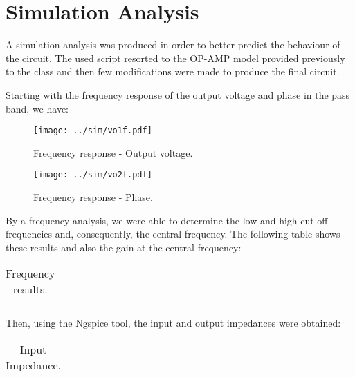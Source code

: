 \section{Simulation Analysis}
\label{sec:simulation}

\par A simulation analysis was produced in order to better predict the behaviour of the circuit. The used script resorted to the OP-AMP model provided previously to the class and then few modifications were made to produce the final circuit.

\par Starting with the frequency response of the output voltage and phase in the pass band, we have:

\begin{figure}[h] \centering
\texttt{[image: ../sim/vo1f.pdf]}
\caption{Frequency response - Output voltage.}
\label{fig:f1}
\end{figure}

\begin{figure}[h] \centering
\texttt{[image: ../sim/vo2f.pdf]}
\caption{Frequency response - Phase.}
\label{fig:f2}
\end{figure}

\newpage

\par By a frequency analysis, we were able to determine the low and high cut-off frequencies and, consequently, the central frequency. The following table shows these results and also the gain at the central frequency:

\begin{table}[h]
  \centering
  \begin{tabular}{|l|r|}
    \hline    
   
   \end{tabular}
  \caption{Frequency results.}
    \label{tab:frs}
\end{table}

\par Then, using the Ngspice tool, the input and output impedances were obtained:

\begin{table}[h]
  \centering
  \begin{tabular}{|l|r|}
    \hline    
   
   \end{tabular}
  \caption{Input Impedance.}
    \label{tab:zin}
\end{table}

\newpage


